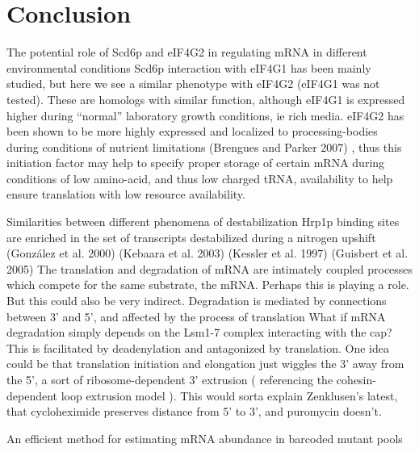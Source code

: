 \chapter{Conclusion}

The potential role of Scd6p and eIF4G2 in
regulating mRNA in different environmental conditions Scd6p
interaction with eIF4G1 has been mainly studied, but here we see a
similar phenotype with eIF4G2 (eIF4G1 was not tested). These are
homologs with similar function, although eIF4G1 is expressed higher
during “normal” laboratory growth conditions, ie rich media. eIF4G2
has been shown to be more highly expressed and localized to
processing-bodies during conditions of nutrient limitations 
(Brengues and Parker 2007)
, thus this initiation factor may help to specify
proper storage of certain mRNA during conditions of low amino-acid,
and thus low charged tRNA, availability to help ensure translation
with low resource availability. 

Similarities between different
phenomena of destabilization Hrp1p binding sites are enriched in the
set of transcripts destabilized during a nitrogen upshift 
(González et al. 2000) (Kebaara et al. 2003) (Kessler et al. 1997) (Guisbert et al.
2005) 
The translation and degradation of mRNA are intimately coupled
processes which compete for the same substrate, the mRNA. Perhaps this
is playing a role. But this could also be very indirect.  Degradation
is mediated by connections between 3’ and 5’, and affected by the
process of translation What if mRNA degradation simply depends on the
Lsm1-7 complex interacting with the cap? This is facilitated by
deadenylation and antagonized by translation. One idea could be that
translation initiation and elongation just wiggles the 3’ away from
the 5’, a sort of ribosome-dependent 3’ extrusion ( referencing the
cohesin-dependent loop extrusion model ).  This would sorta explain
Zenklusen’s latest, that cycloheximide preserves distance from 5’ to
3’, and puromycin doesn’t.  

An efficient method for estimating mRNA
abundance in barcoded mutant pools 


